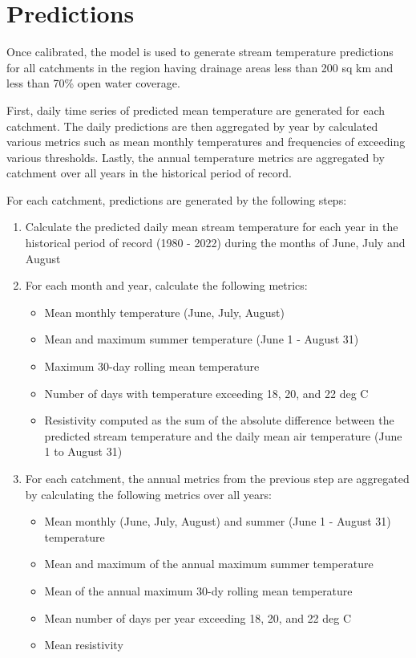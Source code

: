 \documentclass[
]{book}
\providecommand{\tightlist}{%
  \setlength{\itemsep}{0pt}\setlength{\parskip}{0pt}}
\begin{document}
\chapter{Predictions}\label{predictions}

Once calibrated, the model is used to generate stream temperature predictions for all catchments in the region having drainage areas less than 200 sq km and less than 70\% open water coverage.

First, daily time series of predicted mean temperature are generated for each catchment. The daily predictions are then aggregated by year by calculated various metrics such as mean monthly temperatures and frequencies of exceeding various thresholds. Lastly, the annual temperature metrics are aggregated by catchment over all years in the historical period of record.

For each catchment, predictions are generated by the following steps:

\begin{enumerate}
\def\labelenumi{\arabic{enumi}.}
\tightlist
\item
  Calculate the predicted daily mean stream temperature for each year in the historical period of record (1980 - 2022) during the months of June, July and August
\item
  For each month and year, calculate the following metrics:

  \begin{itemize}
  \tightlist
  \item
    Mean monthly temperature (June, July, August)
  \item
    Mean and maximum summer temperature (June 1 - August 31)
  \item
    Maximum 30-day rolling mean temperature
  \item
    Number of days with temperature exceeding 18, 20, and 22 deg C
  \item
    Resistivity computed as the sum of the absolute difference between the predicted stream temperature and the daily mean air temperature (June 1 to August 31)
  \end{itemize}
\item
  For each catchment, the annual metrics from the previous step are aggregated by calculating the following metrics over all years:

  \begin{itemize}
  \tightlist
  \item
    Mean monthly (June, July, August) and summer (June 1 - August 31) temperature
  \item
    Mean and maximum of the annual maximum summer temperature
  \item
    Mean of the annual maximum 30-dy rolling mean temperature
  \item
    Mean number of days per year exceeding 18, 20, and 22 deg C
  \item
    Mean resistivity
  \end{itemize}
\end{enumerate}
\end{document}
